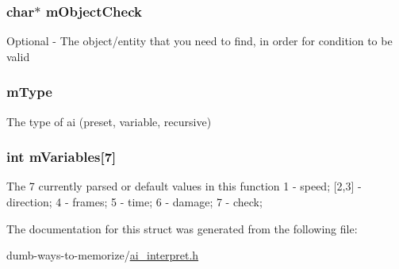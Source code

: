 \subsubsection[{\texorpdfstring{m\+Object\+Check}{mObjectCheck}}]{\setlength{\rightskip}{0pt plus 5cm}char$\ast$ m\+Object\+Check}\hypertarget{structai__function__s_ae9037e9c23c85312470746c5c4379814}{}\label{structai__function__s_ae9037e9c23c85312470746c5c4379814}
Optional -\/ The object/entity that you need to find, in order for condition to be valid 
\subsubsection[{\texorpdfstring{m\+Type}{mType}}]{ m\+Type}\hypertarget{structai__function__s_af4cc7fbcaa3a1268cb1a174203486a8c}{}\label{structai__function__s_af4cc7fbcaa3a1268cb1a174203486a8c}
The type of ai (preset, variable, recursive) 
\subsubsection[{\texorpdfstring{m\+Variables}{mVariables}}]{\setlength{\rightskip}{0pt plus 5cm}int m\+Variables\mbox{[}7\mbox{]}}\hypertarget{structai__function__s_a889d5923f6b7628af2fe824149b5a942}{}\label{structai__function__s_a889d5923f6b7628af2fe824149b5a942}
The 7 currently parsed or default values in this function 1 -\/ speed; \mbox{[}2,3\mbox{]} -\/ direction; 4 -\/ frames; 5 -\/ time; 6 -\/ damage; 7 -\/ check; 

The documentation for this struct was generated from the following file\+:\begin{DoxyCompactItemize}
\item 
dumb-\/ways-\/to-\/memorize/\hyperlink{ai__interpret_8h}{ai\+\_\+interpret.\+h}\end{DoxyCompactItemize}
